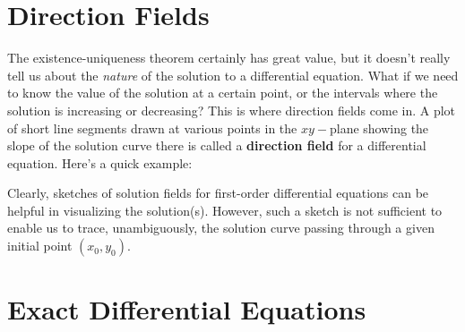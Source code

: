 \documentclass[10pt,reqno]{book}
\theoremstyle{definition}
\begin{document}
	\section{Direction Fields}

	The existence-uniqueness theorem certainly has great value, but it doesn't really tell us about the \textit{nature} of the solution to a differential equation. What if we need to know the value of the solution at a certain point, or the intervals where the solution is increasing or decreasing? This is where direction fields come in.	A plot of short line segments drawn at various points in the $ xy- $plane showing the slope of the solution curve there is called a \textbf{direction field} for a differential equation. Here's a quick example:

	\begin{center}
	\end{center}

	\noindent Clearly, sketches of solution fields for first-order differential equations can be helpful in visualizing the solution(s). However, such a sketch is not sufficient to enable us to trace, unambiguously, the solution curve passing through a given initial point $ (x_0,y_0) $.

	\section{Exact Differential Equations}
\end{document}
